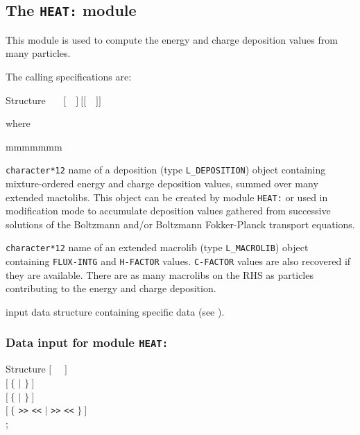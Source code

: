 \subsection{The {\tt HEAT:} module}\label{sect:HEATData}

This module is used to compute the energy and charge deposition values from many particles.

\vskip 0.02cm

The calling specifications are:

\begin{DataStructure}{Structure }
~\moc{:=}~~$[$~~$]~[[$~~$]]$ \moc{::}  \\
\end{DataStructure}

\noindent where
\begin{ListeDeDescription}{mmmmmmm}

\item[\dusa{DEPOS}] {\tt character*12} name of a {\sc deposition} (type {\tt L\_DEPOSITION}) object containing mixture-ordered energy and charge deposition values, summed over many extended mactolibs. This object can be created by module {\tt HEAT:} or used in modification mode to
accumulate deposition values gathered from successive solutions of the Boltzmann and/or Boltzmann Fokker-Planck transport equations.

\item[\dusa{MACRO}] {\tt character*12} name of an extended {\sc macrolib} (type {\tt L\_MACROLIB}) object containing {\tt FLUX-INTG} and {\tt H-FACTOR} values.
{\tt C-FACTOR} values are also recovered if they are available. There are as many macrolibs on the RHS as particles contributing to the energy and charge deposition.

\item[\dusa{HEAT\_data}] input data structure containing specific data (see ).

\end{ListeDeDescription}

\subsubsection{Data input for module {\tt HEAT:}}\label{sect:descHEAT}

\vskip -0.5cm

\begin{DataStructure}{Structure }
$[$~ ~$]$ \\
$[~\{$   $|$   $\}~]$ \\
$[~\{$  $|$  $\}~]$ \\
$[~\{$   {\tt >>}  {\tt <<} $|$   {\tt >>}  {\tt <<} $\}~]$ \\
;
\end{DataStructure}

